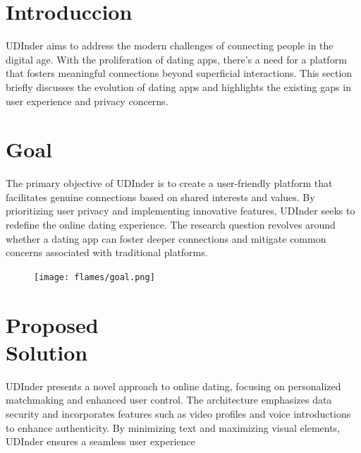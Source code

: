 \documentclass[final]{beamer}
\author{
  \small Nicolas Avendaño Barajas \\
  \footnotesize{20231020113}, \\Advanced-programming, \\Distrital university\\
  \and
  \small Juan Sebastian Vega Diaz \\
  \footnotesize{20231020087}, \\Advanced-programming, \\Distrital university}
\begin{document}
\begin{poster}



\newcolumn
\section{Introduccion}
\justifying
UDInder aims to address the modern challenges of connecting people in the digital age. With the proliferation of dating apps, there's a need for a platform that fosters meaningful connections beyond superficial interactions. This section briefly discusses the evolution of dating apps and highlights the existing gaps in user experience and privacy concerns.


\section{Goal}
\justifying
The primary objective of UDInder is to create a user-friendly platform that facilitates genuine connections based on shared interests and values. By prioritizing user privacy and implementing innovative features, UDInder seeks to redefine the online dating experience. The research question revolves around whether a dating app can foster deeper connections and mitigate common concerns associated with traditional platforms.


\begin{figure}
    \texttt{[image: flames/goal.png]}
    \caption{\sffamily                                                                        }
    \label{fig:pic1}
\end{figure}

\newcolumn

\section{Proposed \\Solution}
\justifying
UDInder presents a novel approach to online dating, focusing on personalized matchmaking and enhanced user control. The architecture emphasizes data security and incorporates features such as video profiles and voice introductions to enhance authenticity. By minimizing text and maximizing visual elements, UDInder ensures a seamless user experience


\end{poster}
\end{document}
